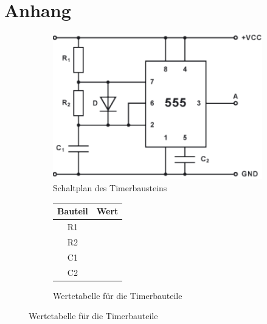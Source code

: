 \chapter{Anhang}
\label{ch:anhang}

\begin{figure}
	\centering
	\begin{subfigure}{\textwidth}
		\includegraphics[height=.4\textheight]{images/ne555_astabile_kippstufe.pdf}
		\caption{Schaltplan des Timerbausteins \cite{ELKO}}
		\label{fig:schaltplan_ne555}
	\end{subfigure}
	\par\bigskip
	\begin{subfigure}{.3\textwidth}
		
		\begin{tabular}{|c|c|}
			\hline Bauteil & Wert \\ 
			\hline R1 &  \\ 
			\hline R2 &  \\ 
			\hline C1 &  \\ 
			\hline C2 &  \\ 
			\hline 
		\end{tabular} 
	\caption{Wertetabelle für die Timerbauteile}
	\label{fig:wertetabelle_ne555}
	\end{subfigure}
	

\end{figure}
